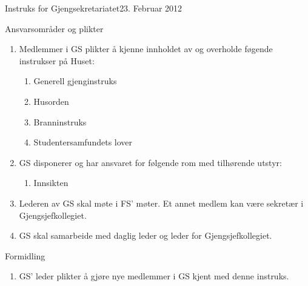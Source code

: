 \documentclass[../../fsbok.tex]{subfiles}
\begin{document}
\begin{instruks}{Instruks for Gjengsekretariatet}{23. Februar 2012}{}
    \begin{instruksledd}{Ansvarsområder og plikter}
        \begin{enumerate}
            \item Medlemmer i GS plikter å kjenne innholdet av og overholde
	    føgende instrukser på Huset:
                \begin{enumerate}
                    \item Generell gjenginstruks
                    \item Husorden
                    \item Branninstruks
                    \item Studentersamfundets lover
                \end{enumerate}
            \item GS disponerer og har ansvaret for følgende rom med tilhørende utstyr:
		\begin{enumerate}
			\item Innsikten
		\end{enumerate}
            \item Lederen av GS skal møte i FS' møter. Et annet medlem kan være sekretær i
Gjengsjefkollegiet.
            \item GS skal samarbeide med daglig leder og leder for Gjengsjefkollegiet.
        \end{enumerate}
    \end{instruksledd}

    \begin{instruksledd}{Formidling}
        \begin{enumerate}
            \item GS' leder plikter å gjøre nye medlemmer i GS kjent med denne instruks.
        \end{enumerate}
    \end{instruksledd}


\end{instruks}
\end{document}

